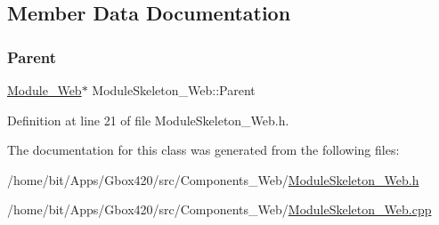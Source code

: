 \subsection{Member Data Documentation}
\mbox{\label{class_module_skeleton___web_a1d1f4bc02a96a7e25defd87ef2c06df8}} 
\subsubsection{\texorpdfstring{Parent}{Parent}}
{\footnotesize\ttfamily \hyperlink{class_module___web}{Module\+\_\+\+Web}$\ast$ Module\+Skeleton\+\_\+\+Web\+::\+Parent\hspace{0.3cm}{\ttfamily [protected]}}



Definition at line 21 of file Module\+Skeleton\+\_\+\+Web.\+h.



The documentation for this class was generated from the following files\+:\begin{DoxyCompactItemize}
\item 
/home/bit/\+Apps/\+Gbox420/src/\+Components\+\_\+\+Web/\hyperlink{_module_skeleton___web_8h}{Module\+Skeleton\+\_\+\+Web.\+h}\item 
/home/bit/\+Apps/\+Gbox420/src/\+Components\+\_\+\+Web/\hyperlink{_module_skeleton___web_8cpp}{Module\+Skeleton\+\_\+\+Web.\+cpp}\end{DoxyCompactItemize}
